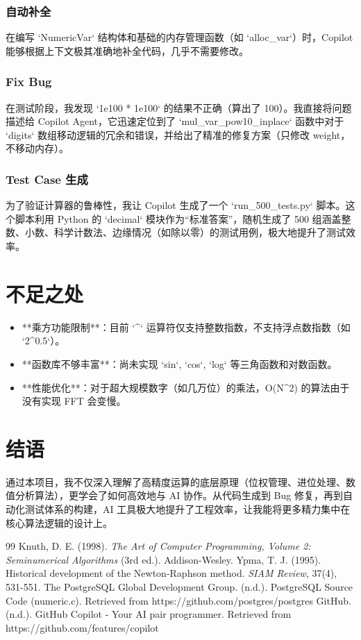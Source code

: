 \documentclass[UTF8]{ctexart}
\begin{document}
\subsubsection{自动补全}
在编写 `NumericVar` 结构体和基础的内存管理函数（如 `alloc_var`）时，Copilot 能够根据上下文极其准确地补全代码，几乎不需要修改。

\subsubsection{Fix Bug}
在测试阶段，我发现 `1e100 * 1e100` 的结果不正确（算出了 100）。我直接将问题描述给 Copilot Agent，它迅速定位到了 `mul_var_pow10_inplace` 函数中对于 `digits` 数组移动逻辑的冗余和错误，并给出了精准的修复方案（只修改 weight，不移动内存）。

\subsubsection{Test Case 生成}
为了验证计算器的鲁棒性，我让 Copilot 生成了一个 `run_500_tests.py` 脚本。这个脚本利用 Python 的 `decimal` 模块作为“标准答案”，随机生成了 500 组涵盖整数、小数、科学计数法、边缘情况（如除以零）的测试用例，极大地提升了测试效率。

\section{不足之处}
\begin{itemize}
    \item **乘方功能限制**：目前 `^` 运算符仅支持整数指数，不支持浮点数指数（如 `2^0.5`）。
    \item **函数库不够丰富**：尚未实现 `sin`, `cos`, `log` 等三角函数和对数函数。
    \item **性能优化**：对于超大规模数字（如几万位）的乘法，O(N^2) 的算法由于没有实现 FFT 会变慢。
\end{itemize}

\section{结语}
通过本项目，我不仅深入理解了高精度运算的底层原理（位权管理、进位处理、数值分析算法），更学会了如何高效地与 AI 协作。从代码生成到 Bug 修复，再到自动化测试体系的构建，AI 工具极大地提升了工程效率，让我能将更多精力集中在核心算法逻辑的设计上。

\begin{thebibliography}{99}
     Knuth, D. E. (1998). \textit{The Art of Computer Programming, Volume 2: Seminumerical Algorithms} (3rd ed.). Addison-Wesley.
     Ypma, T. J. (1995). Historical development of the Newton-Raphson method. \textit{SIAM Review}, 37(4), 531-551.
     The PostgreSQL Global Development Group. (n.d.). PostgreSQL Source Code (numeric.c). Retrieved from https://github.com/postgres/postgres
     GitHub. (n.d.). GitHub Copilot - Your AI pair programmer. Retrieved from https://github.com/features/copilot
\end{thebibliography}
\end{document}
